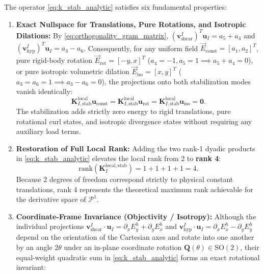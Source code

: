 \documentclass[preprint,12pt]{elsarticle}
\begin{document}
The operator \eqref{eq:k_stab_analytic} satisfies six fundamental properties:
\begin{enumerate}
    \item \textbf{Exact Nullspace for Translations, Pure Rotations, and Isotropic Dilations:} By \eqref{eq:orthogonality_gram_matrix}, $(\mathbf{v}_{\mathrm{shear}}^I)^T \mathbf{u}_I = a_5 + a_4$ and $(\mathbf{v}_{\mathrm{hyp}}^I)^T \mathbf{u}_I = a_3 - a_6$. Consequently, for any uniform field $\vec{E}_{\mathrm{const}} = [a_1, a_2]^T$, pure rigid-body rotation $\vec{E}_{\mathrm{rot}} = [-y, x]^T$ ($a_4 = -1, a_5 = 1 \implies a_5 + a_4 = 0$), or pure isotropic volumetric dilation $\vec{E}_{\mathrm{iso}} = [x, y]^T$ ($a_3 = a_6 = 1 \implies a_3 - a_6 = 0$), the projections onto both stabilization modes vanish identically:
          \begin{equation}
              \mathbf{K}_{I, \mathrm{stab}}^{\mathrm{local}} \mathbf{u}_{\mathrm{const}} = \mathbf{K}_{I, \mathrm{stab}}^{\mathrm{local}} \mathbf{u}_{\mathrm{rot}} = \mathbf{K}_{I, \mathrm{stab}}^{\mathrm{local}} \mathbf{u}_{\mathrm{iso}} = \mathbf{0}.
          \end{equation}
          The stabilization adds strictly zero energy to rigid translations, pure rotational curl states, and isotropic divergence states without requiring any auxiliary load terms.
    \item \textbf{Restoration of Full Local Rank:} Adding the two rank-1 dyadic products in \eqref{eq:k_stab_analytic} elevates the local rank from 2 to \textbf{rank 4}:
          \begin{equation}
              \mathrm{rank}\left(\mathbf{K}_I^{\mathrm{local, stab}}\right) = 1 + 1 + 1 + 1 = 4.
          \end{equation}
          Because 2 degrees of freedom correspond strictly to physical constant translations, rank 4 represents the theoretical maximum rank achievable for the derivative space of $\mathcal{P}^1$.
    \item \textbf{Coordinate-Frame Invariance (Objectivity / Isotropy):} Although the individual projections $\mathbf{v}_{\mathrm{shear}}^I \cdot \mathbf{u}_I = \partial_x E_y^h + \partial_y E_x^h$ and $\mathbf{v}_{\mathrm{hyp}}^I \cdot \mathbf{u}_I = \partial_x E_x^h - \partial_y E_y^h$ depend on the orientation of the Cartesian axes and rotate into one another by an angle $2\theta$ under an in-plane coordinate rotation $\mathbf{Q}(\theta) \in \mathrm{SO}(2)$, their equal-weight quadratic sum in \eqref{eq:k_stab_analytic} forms an exact rotational invariant:

\end{enumerate}
\end{document}
